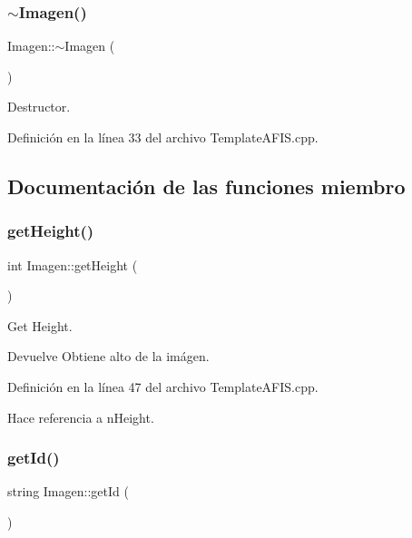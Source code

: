 \subsubsection{\texorpdfstring{$\sim$\+Imagen()}{~Imagen()}}
{\footnotesize\ttfamily Imagen\+::$\sim$\+Imagen (\begin{DoxyParamCaption}{ }\end{DoxyParamCaption})}



Destructor. 



Definición en la línea 33 del archivo Template\+A\+F\+I\+S.\+cpp.



\subsection{Documentación de las funciones miembro}
\hypertarget{classImagen_a1f243282c3f962c9694b53bc9106215b}{}\label{classImagen_a1f243282c3f962c9694b53bc9106215b} 
\subsubsection{\texorpdfstring{get\+Height()}{getHeight()}}
{\footnotesize\ttfamily int Imagen\+::get\+Height (\begin{DoxyParamCaption}{ }\end{DoxyParamCaption})}



Get Height. 

\begin{DoxyReturn}{Devuelve}
Obtiene alto de la imágen. 
\end{DoxyReturn}


Definición en la línea 47 del archivo Template\+A\+F\+I\+S.\+cpp.



Hace referencia a n\+Height.

\hypertarget{classImagen_a4cac81ed0243f264dcbaae552b936038}{}\label{classImagen_a4cac81ed0243f264dcbaae552b936038} 
\subsubsection{\texorpdfstring{get\+Id()}{getId()}}
{\footnotesize\ttfamily string Imagen\+::get\+Id (\begin{DoxyParamCaption}{ }\end{DoxyParamCaption})}



